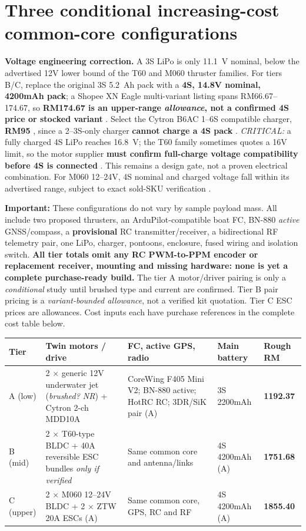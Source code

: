 \section{Three conditional increasing-cost common-core configurations}
\textbf{Voltage engineering correction.} A 3S LiPo is only \SI{11.1}{V} nominal, below the advertised 12V lower bound of the T60 and M060 thruster families. For tiers B/C, replace the original 3S \SI{5.2}{Ah} pack with a \textbf{4S, 14.8V nominal, 4200mAh pack}; a Shopee XN Eagle multi-variant listing spans RM66.67--174.67, so \textbf{RM174.67 is an upper-range \emph{allowance}, not a confirmed 4S price or stocked variant} \cite{bat4Shopee}. Select the Cytron B6AC 1--6S compatible charger, \textbf{RM95} \cite{charger4}, since a 2--3S-only charger \textbf{cannot charge a 4S pack} \cite{charger}. \emph{CRITICAL:} a fully charged 4S LiPo reaches \SI{16.8}{V}; the T60 family sometimes quotes a 16V limit, so the motor supplier \textbf{must confirm full-charge voltage compatibility before 4S is connected} \cite{hobbyRef,hobbyShop}. This remains a design gate, not a proven electrical combination. For M060 12--24V, 4S nominal and charged voltage fall within its advertised range, subject to exact sold-SKU verification \cite{m060Shop}.

\textbf{Important:} These configurations do not vary by sample payload mass. All include two proposed thrusters, an ArduPilot-compatible boat FC, BN-880 \emph{active} GNSS/compass, a \textbf{provisional} RC transmitter/receiver, a bidirectional RF telemetry pair, one LiPo, charger, pontoons, enclosure, fused wiring and isolation switch. \textbf{All tier totals omit any RC PWM-to-PPM encoder or replacement receiver, mounting and missing hardware: none is yet a complete purchase-ready build.} The tier A motor/driver pairing is only a \emph{conditional} study until brushed type and current are confirmed. Tier B pair pricing is a \emph{variant-bounded allowance}, not a verified kit quotation. Tier C ESC prices are allowances. Cost inputs each have purchase references in the complete cost table below.

\begin{tabularx}{\linewidth}{L{17mm}Y Y Y L{18mm}}
\toprule \textbf{Tier} & \textbf{Twin motors / drive} & \textbf{FC, active GPS, radio} & \textbf{Main battery} & \textbf{Rough RM}\\\midrule
A (low) & 2 $\times$ generic 12V underwater jet (\emph{brushed? NR}) + Cytron 2-ch MDD10A \cite{jetShop,mdd10} & CoreWing F405 Mini V2; BN-880 active; HotRC RC; 3DR/SiK pair (A) \cite{coreShop,bnShop,hotrc,radioShop} & 3S 2200mAh \cite{bat22} & \textbf{1192.37}\\
B (mid) & 2 $\times$ T60-type BLDC + 40A reversible ESC bundles \emph{only if verified} \cite{hobbyShop,hobbyRef} & Same common core and antenna/links \cite{coreShop,bnData,hotrc,radioShop} & 4S 4200mAh (A) \cite{bat4Shopee} & \textbf{1751.68}\\
C (upper) & 2 $\times$ M060 12--24V BLDC + 2 $\times$ ZTW 20A ESCs (A) \cite{m060Shop,ztwShop} & Same common core, GPS, RC and RF \cite{coreShop,bnShop,hotrc,radioShop} & 4S 4200mAh (A) \cite{bat4Shopee} & \textbf{1855.40}\\
\bottomrule
\end{tabularx}

